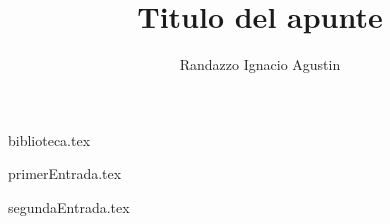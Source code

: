 

\title{Titulo del apunte}
\author{Randazzo Ignacio Agustin}


\maketitle
\tableofcontents

{biblioteca.tex}

{primerEntrada.tex}

{segundaEntrada.tex}



